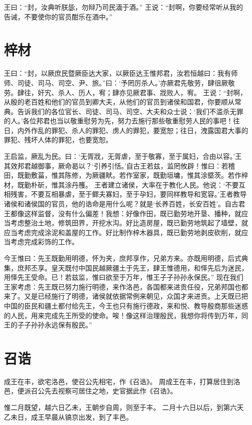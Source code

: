 \documentclass[12pt,UTF8]{ctexbook}
\begin{document}
王曰：“封，汝典听朕毖，勿辩乃司民湎于酒。”
王说：“封啊，你要经常听从我的告诫，不要使你的官员酣乐在酒中。”

\chapter{梓材}

王曰：“封，以厥庶民暨厥臣达大家，以厥臣达王惟邦君，汝若恒越曰：我有师师、司徒、司马、司空、尹、旅。”曰：‘予罔厉杀人。’亦厥君先敬劳，肆徂厥敬劳。肆往，奸宄、杀人、历人，宥；肆亦见厥君事、戕败人，宥。
王说：“封啊，从殷的老百姓和他们的官员到卿大夫，从他们的官员到诸侯和国君，你要顺从常典。告诉我们的各位官长、司徒、司马、司空、大夫和众士说：‘我们不滥杀无罪的人。’各位邦君也当以敬重慰劳为先，努力去施行那些敬重慰劳人民的事吧！往日，内外作乱的罪犯、杀人的罪犯、虏人的罪犯，要宽恕；往日，洩露国君大事的罪犯、残坏人体的罪犯，也要宽恕。

王启监，厥乱为民。曰：‘无胥戕，无胥虐，至于敬寡，至于属妇，合由以容。’王其效邦君越御事，厥命曷以？‘引养引恬。’自古王若兹，监罔攸辟！惟曰：若稽田，既勤敷菑，惟其陈修，为厥疆畎。若作室家，既勤垣墉，惟其涂塈茨。若作梓材，既勤朴斫，惟其涂丹雘。
王者建立诸侯，大率在于教化人民。他说：‘不要互相残害，不要互相暴虐，至于鳏夫寡妇，至于孕妇，要同样教导和宽容。’王者教导诸侯和诸侯国的官员，他的诰命是用什么呢？就是‘长养百姓，长安百姓’。自古君王都像这样监督，没有什么偏差！我想：好像作田，既已勤劳地开垦、播种，就应当考虑整治土地，修筑田界，开挖水沟。好比造房屋，既已勤劳地筑起了墙壁，就应当考虑完成涂泥和盖屋的工作。好比制作梓木器具，既已勤劳地剥皮砍削，就应当考虑完成彩饰的工作。

今王惟曰：先王既勤用明德，怀为夹，庶邦享作，兄弟方来。亦既用明德，后式典集，庶邦丕享。皇天既付中国民越厥疆土于先王，肆王惟德用，和怿先后为迷民，用怿先王受命。已！若兹监，惟曰欲至于万年，惟王子子孙孙永保民。”
现在我们王家考虑：先王既已努力施行明德，来作洛邑，各国都来进贡任役，兄弟邦国也都来了。又是已经施行了明德，诸侯就依据常例来朝见，众国才来进贡。上天既已把中国的臣民和疆土都付给先王，今王也只有施行德政，来和悦、教导殷商那些迷惑的人民，用来完成先王所受的使命。唉！像这样治理殷民，我想你将传到万年，同王的子子孙孙永远保有殷民。”

\chapter{召诰}

成王在丰，欲宅洛邑，使召公先相宅，作《召诰》。
周成王在丰，打算居住到洛邑，便派召公先去视察可居住之地，史官据此作《召诰》。

惟二月既望，越六日乙未，王朝步自周，则至于丰。
二月十六日以后，到第六天乙未日，成王早晨从镐京出发，到了丰邑。
\end{document}
